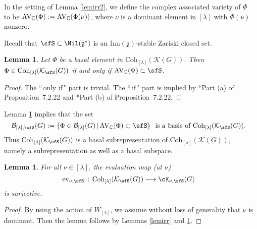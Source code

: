 \documentclass[12pt,a4paper]{amsart}
\newcommand{\AV}{\mathrm{AV}}
\newcommand{\CK}{{\mathcal {K}}}
\newcommand{\g}{\mathfrak g}
\newcommand{\be}{\begin {equation}}
\newcommand{\ee}{\end {equation}}
\numberwithin{equation}{section}
\newtheorem{lem}[thm]{Lemma}
\theoremstyle{remark}
\def\Coh{\mathrm{Coh}}
\def\Inn{\mathrm{Inn}}
\newcommand{\Lam}{{[\lambda]}}
\newcommand{\Grt}{\cK}
\begin{document}
In the setting of Lemma \ref{lemirr2}, we define the complex associated variety of $\Phi$ to be $ \AV_\C(\Phi):= \AV_\C(\Phi(\nu))$, where $\nu$ is a dominant element in $\Lam$ with $\Phi(\nu)$ nonzero.

Recall that $\sfS\subset \Nil(\g^*)$ is an $\Inn(\g)$-stable Zariski closed set.

\begin{lem}\label{lemirr11}
Let $\Phi$ be a basal element in $\Coh_{[\lambda]}(\CK(G))$. Then  $\Phi \in \Coh_{[\lambda]}(\CK_\sfS(G))$ if and only if $\AV_\C(\Phi)\subset \sfS$.
         \end{lem}
\begin{proof}
The ``$\,$only if$\,$" part is trivial. The ``$\,$if$\,$" part is implied by \cite{Vg}*{Part (a) of Proposition~7.2.22} and
\cite{Vg}*{Part (b) of Proposition~7.2.22}.
\end{proof}

Lemma \ref{lemirr11} implies that the set
\be\label{basiss}
   \mathcal B_{\Lam,\sfS}(G):=\{\Phi\in \mathcal B_\Lam(G)\,|\,\AV_\C(\Phi)\subset \sfS\}
  \  \textrm{
    is a basis of $ \Coh_{[\lambda]}(\CK_\sfS(G))$.}
    \ee
     Thus $ \Coh_{[\lambda]}(\CK_\sfS(G))$ is a basal subrepresentation of $ \Coh_{[\lambda]}(\CK(G))$, namely a subrepresentation as well as a basal subspace.

\begin{lem}\label{sur111}
For all $\nu\in\Lam$, the evaluation map  (at $\nu$)
  \[
    \mathrm{ev}_{\nu , \sfS} \, :\, \Coh_{[\lambda]}(\CK_\sfS(G)) \longrightarrow \Grt_{\nu, \sfS}(G)
  \]
 is surjective.
\end{lem}
\begin{proof}
By using the action of $W_\Lam$, we assume without loss of generality that $\nu$ is dominant. Then the lemma follows by Lemmas \ref{lemirr} and \ref{lemirr11}.
\end{proof}
\end{document}
